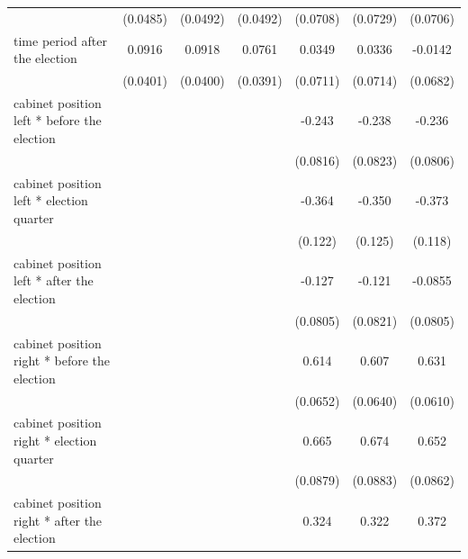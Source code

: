 \documentclass[a4paper,12pt]{article}
\newcommand{\sym}[1]{\rlap{#1}}
\begin{document}
\begin{table}
\begin{tabular}{l*{6}{c}}
	&  (0.0485)         &  (0.0492)         &  (0.0492)         &  (0.0708)         &  (0.0729)         &  (0.0706)         \\
	[0.3em]
	time period after the election          &    0.0916\sym{*}  &    0.0918\sym{*}  &    0.0761         &    0.0349         &    0.0336         &   -0.0142         \\
	&  (0.0401)         &  (0.0400)         &  (0.0391)         &  (0.0711)         &  (0.0714)         &  (0.0682)         \\
	[0.3em]
	cabinet position left * before the election&                   &                   &                   &    -0.243\sym{**} &    -0.238\sym{**} &    -0.236\sym{**} \\
	&                   &                   &                   &  (0.0816)         &  (0.0823)         &  (0.0806)         \\
	[0.3em]
	cabinet position left * election quarter&                   &                   &                   &    -0.364\sym{**} &    -0.350\sym{**} &    -0.373\sym{**} \\
	&                   &                   &                   &   (0.122)         &   (0.125)         &   (0.118)         \\
	[0.3em]
	cabinet position left * after the election&                   &                   &                   &    -0.127         &    -0.121         &   -0.0855         \\
	&                   &                   &                   &  (0.0805)         &  (0.0821)         &  (0.0805)         \\
	[0.3em]
	cabinet position right * before the election&                   &                   &                   &     0.614\sym{***}&     0.607\sym{***}&     0.631\sym{***}\\
	&                   &                   &                   &  (0.0652)         &  (0.0640)         &  (0.0610)         \\
	[0.3em]
	cabinet position right * election quarter&                   &                   &                   &     0.665\sym{***}&     0.674\sym{***}&     0.652\sym{***}\\
	&                   &                   &                   &  (0.0879)         &  (0.0883)         &  (0.0862)         \\
	[0.3em]
	cabinet position right * after the election&                   &                   &                   &     0.324\sym{***}&     0.322\sym{***}&     0.372\sym{***}\\

\end{tabular}
\end{table}
\end{document}
